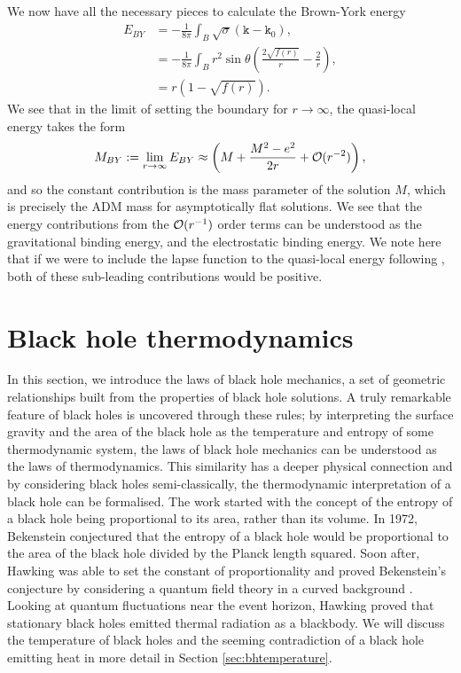 We now have all the necessary pieces to calculate the Brown-York energy
\begin{equation*}
	\begin{aligned}
		E_{BY} &=  -\frac{1}{8 \pi} \int_{B} \sqrt{\sigma} (\mathtt{k} - \mathtt{k}_0) ,\\
		&=  -\frac{1}{8 \pi} \int_{B} r^2 \sin \theta \left( \frac{2 \sqrt{f(r)}}{r} - \frac{2}{r} \right) ,\\
		&=  r \left( 1 - \sqrt{f(r)}  \right).
	\end{aligned}
\end{equation*}
We see that in the limit of setting the boundary for $r \rightarrow \infty$, the quasi-local energy takes the form
\begin{equation*}
	M_{BY} := \lim_{r \rightarrow \infty} E_{BY} \approx \left( M + \frac{M^2 - e^2}{2r} + {\cal O}(r^{-2})  \right),
\end{equation*}
and so the constant contribution is the mass parameter of the solution $M$, which is precisely the ADM mass for asymptotically flat solutions. We see that the energy contributions from the ${\cal O}(r^{-1})$ order terms can be understood as the gravitational binding energy, and the electrostatic binding energy. We note here that if we were to include the lapse function to the quasi-local energy following \cite{Katz_1988}, both of these sub-leading contributions would be positive.


\section{Black hole thermodynamics}
\label{sec:bhthermo}

In this section, we introduce the laws of black hole mechanics, a set of geometric relationships built from the properties of black hole solutions. A truly remarkable feature of black holes is uncovered through these rules; by interpreting the surface gravity and the area of the black hole as the temperature and entropy of some thermodynamic system, the laws of black hole mechanics can be understood as the laws of thermodynamics. This similarity has a deeper physical connection and by considering black holes semi-classically, the thermodynamic interpretation of a black hole can be formalised. The work started with the concept of the entropy of a black hole being proportional to its area, rather than its volume. In 1972, Bekenstein conjectured \cite{Bekenstein:1973ur} that the entropy of a black hole would be proportional to the area of the black hole divided by the Planck length squared. Soon after, Hawking was able to set the constant of proportionality and proved Bekenstein's conjecture by considering a quantum field theory in a curved background \cite{Hawking:1974sw}. Looking at quantum fluctuations near the event horizon, Hawking proved that stationary black holes emitted thermal radiation as a blackbody. We will discuss the temperature of black holes and the seeming contradiction of a black hole emitting heat in more detail in Section \ref{sec:bhtemperature}. 

